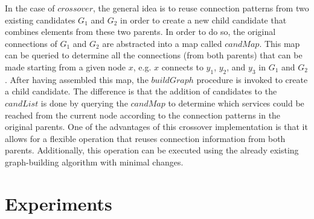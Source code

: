 In the case of $crossover$, the general idea is to reuse connection patterns from two existing candidates $G_1$ and $G_2$ in order to create a new child candidate that combines elements from these two parents. In order to do so, the original connections of $G_1$ and $G_2$ are abstracted into a map called $candMap$. This map can be queried to determine all the connections (from both parents) that can be made starting from a given node $x$, e.g. $x$ connects to $y_1$, $y_2$, and $y_3$ in $G_1$ and $G_2$. After having assembled this map, the $buildGraph$ procedure is invoked to create a child candidate. The difference is that the addition of candidates to the $candList$ is done by querying the $candMap$ to determine which services could be reached from the current node according to the connection patterns in the original parents. One of the advantages of this crossover implementation is that it allows for a flexible operation that reuses connection information from both parents. Additionally, this operation can be executed using the already existing graph-building algorithm with minimal changes.

\section{Experiments}
